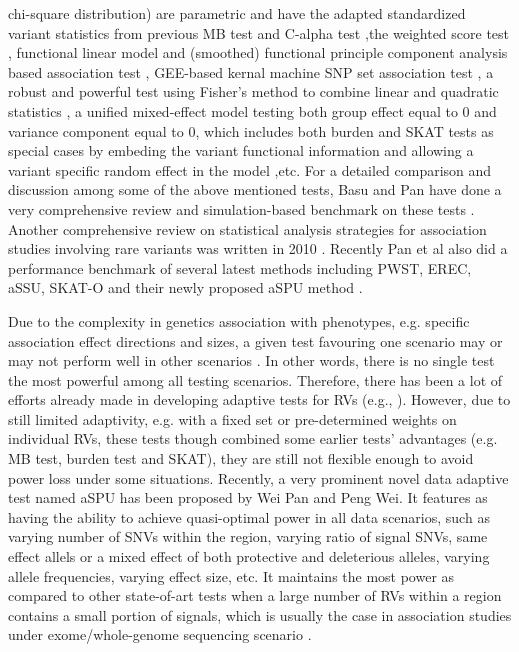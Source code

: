 \documentclass[12pt]{article}
\begin{document}
chi-square distribution) are parametric and have the adapted standardized variant statistics from previous MB test and C-alpha test \cite{Chen2012},the weighted score test \cite{Cai2012}, functional linear model and (smoothed) functional principle component analysis based association test \cite{Luo2011,Luo2012, Luo2012a,Fan2013}, GEE-based kernal machine SNP set association test \cite{Wang2013}, a robust and powerful test using Fisher's method to combine linear and quadratic statistics \cite{Derkach2013}, a unified mixed-effect model testing both group effect equal to 0 and variance component equal to 0, which includes both burden and SKAT tests as special cases by embeding the variant functional information and allowing a variant specific random effect in the model \cite{Sun2013},etc. For a detailed comparison and discussion among some of the above mentioned tests, Basu and Pan have done a very comprehensive review and simulation-based benchmark on these tests \cite{Basu2011}. Another comprehensive review on statistical analysis strategies for association studies involving rare variants was written in 2010 \cite{Bansal2010}. Recently Pan et al also did a performance benchmark of several latest methods including PWST, EREC, aSSU, SKAT-O and their newly proposed aSPU method \cite{pan2014powerful}.

Due to the complexity in genetics association with phenotypes, e.g. specific association effect directions and sizes, a given test favouring one scenario may or may not perform well in other scenarios \cite{Derkach2013,pan2014powerful,Sun2013}. In other words, there is no single test the most powerful among all testing scenarios. Therefore, there has been a lot of efforts already made in developing adaptive tests for RVs (e.g., \cite{Derkach2013,Chen2012,Han2010,Lee2012,Lin2011,Pan2011,Sun2013,Zhang2011}). However, due to still limited adaptivity, e.g. with a fixed set or pre-determined weights on individual RVs, these tests though combined some earlier tests' advantages (e.g. MB test, burden test and SKAT), they are still not flexible enough to avoid power loss under some situations. Recently, a very prominent novel data adaptive test named aSPU has been proposed by Wei Pan and Peng Wei\cite{pan2014powerful}. It features as having the ability to achieve quasi-optimal power in all data scenarios, such as varying number of SNVs within the region, varying ratio of signal SNVs, same effect allels or a mixed effect of both protective and deleterious alleles, varying allele frequencies, varying effect size, etc. It maintains the most power as compared to other state-of-art tests when a large number of RVs within a region contains a small portion of signals, which is usually the case in association studies under exome/whole-genome sequencing scenario \cite{pan2014powerful}.
\end{document}
